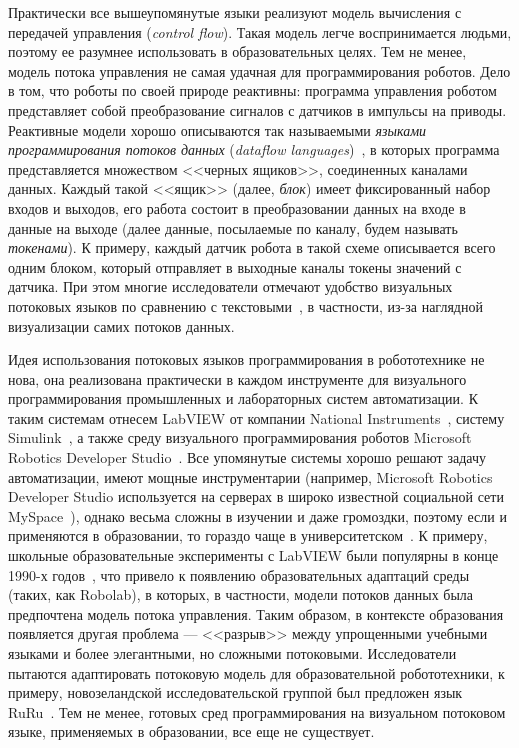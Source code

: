 \documentclass[conference]{IEEEtran}
\begin{document}
Практически все вышеупомянутые языки реализуют модель вычисления с передачей управления (\textit{control flow}). Такая модель легче воспринимается людьми, поэтому ее разумнее использовать в образовательных целях. Тем не менее, модель потока управления не самая удачная для программирования роботов. Дело в том, что роботы по своей природе реактивны: программа управления роботом представляет собой преобразование сигналов с датчиков в импульсы на приводы. Реактивные модели хорошо описываются так называемыми \textit{языками программирования потоков данных} (\textit{dataflow languages})~\cite{johnston2004advances}, в которых программа представляется множеством <<черных ящиков>>, соединенных каналами данных. Каждый такой <<ящик>> (далее, \textit{блок}) имеет фиксированный набор входов и выходов, его работа состоит в преобразовании данных на входе в данные на выходе (далее данные, посылаемые по каналу, будем называть \textit{токенами}). К примеру, каждый датчик робота в такой схеме описывается всего одним блоком, который отправляет в выходные каналы токены значений с датчика. При этом многие исследователи отмечают удобство визуальных потоковых языков по сравнению с текстовыми~\cite{johnston2004advances}, в частности, из-за наглядной визуализации самих потоков данных.

Идея использования потоковых языков программирования в робототехнике не нова, она реализована практически в каждом инструменте для визуального программирования промышленных и лабораторных систем автоматизации. К таким системам отнесем LabVIEW от компании National Instruments~\cite{kodosky1991visual}, систему Simulink~\cite{dabney2004mastering}, а также среду визуального программирования роботов Microsoft Robotics Developer Studio~\cite{jackson2007microsoft}. Все упомянутые системы хорошо решают задачу автоматизации, имеют мощные инструментарии (например, Microsoft Robotics Developer Studio используется на серверах в широко известной социальной сети MySpace~\cite{scherotter2009ccr}), однако весьма сложны в изучении и даже громоздки, поэтому если и применяются в образовании, то гораздо чаще в университетском~\cite{stefanovic2011labview,yi2005labview}. К примеру, школьные образовательные эксперименты с LabVIEW были популярны в конце 1990-х годов~\cite{cyr1997low,portsmore1999robolab}, что привело к появлению образовательных адаптаций среды (таких, как Robolab), в которых, в частности, модели потоков данных была предпочтена модель потока управления. Таким образом, в контексте образования появляется другая проблема --- <<разрыв>> между упрощенными учебными языками и более элегантными, но сложными потоковыми. Исследователи пытаются адаптировать потоковую модель для образовательной робототехники,     к примеру, новозеландской исследовательской группой был предложен язык RuRu~\cite{diprose2011ruru}. Тем не менее, готовых сред программирования на визуальном потоковом языке, применяемых в образовании, все еще не существует.
\end{document}
